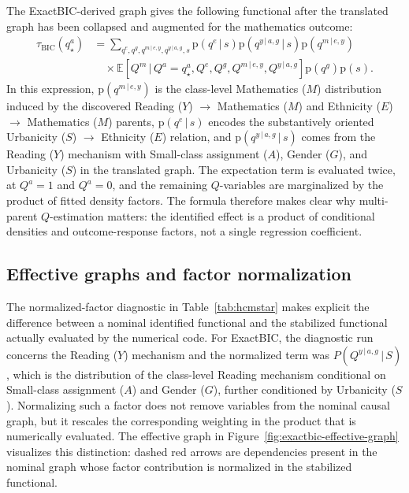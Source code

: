 \documentclass[unnumsec,webpdf,contemporary,large]{oup-authoring-template}%
\theoremstyle{thmstyleone}%
\theoremstyle{thmstyletwo}%
\theoremstyle{thmstylethree}%
\newcommand{\E}[1]{\mathbb{E}\left[#1\right]}
\newcommand{\g}{\,\vert\,}
\newcommand{\pr}{\mathrm{p}}
\begin{document}
The ExactBIC-derived graph gives the following functional after the translated graph has been collapsed and augmented for the mathematics outcome:
\begin{align}
\tau_{\mathrm{BIC}}(q^a_\star)
&=
\sum_{q^e,q^g,q^{m\g e,y},q^{y\g a,g},s}
\pr(q^e\g s)
\pr(q^{y\g a,g}\g s)
\pr(q^{m\g e,y})
\nonumber\\
&\quad\times
\E{Q^m \g Q^a=q^a_\star,Q^e,Q^g,Q^{m\g e,y},Q^{y\g a,g}}
\pr(q^g)\pr(s).
\label{eq:bicstar}
\end{align}
In this expression, $\pr(q^{m\g e,y})$ is the class-level Mathematics ($M$) distribution induced by the discovered Reading ($Y$) $\to$ Mathematics ($M$) and Ethnicity ($E$) $\to$ Mathematics ($M$) parents, $\pr(q^e\g s)$ encodes the substantively oriented Urbanicity ($S$) $\to$ Ethnicity ($E$) relation, and $\pr(q^{y\g a,g}\g s)$ comes from the Reading ($Y$) mechanism with Small-class assignment ($A$), Gender ($G$), and Urbanicity ($S$) in the translated graph.
The expectation term is evaluated twice, at $Q^a=1$ and $Q^a=0$, and the remaining $Q$-variables are marginalized by the product of fitted density factors.
The formula therefore makes clear why multi-parent $Q$-estimation matters: the identified effect is a product of conditional densities and outcome-response factors, not a single regression coefficient.

\subsection{Effective graphs and factor normalization}

The normalized-factor diagnostic in Table~\ref{tab:hcmstar} makes explicit the difference between a nominal identified functional and the stabilized functional actually evaluated by the numerical code.
For ExactBIC, the diagnostic run concerns the Reading ($Y$) mechanism and the normalized term was $P(Q^{y\g a,g}\g S)$, which is the distribution of the class-level Reading mechanism conditional on Small-class assignment ($A$) and Gender ($G$), further conditioned by Urbanicity ($S$).
Normalizing such a factor does not remove variables from the nominal causal graph, but it rescales the corresponding weighting in the product that is numerically evaluated.
The effective graph in Figure~\ref{fig:exactbic-effective-graph} visualizes this distinction: dashed red arrows are dependencies present in the nominal graph whose factor contribution is normalized in the stabilized functional.
\end{document}

